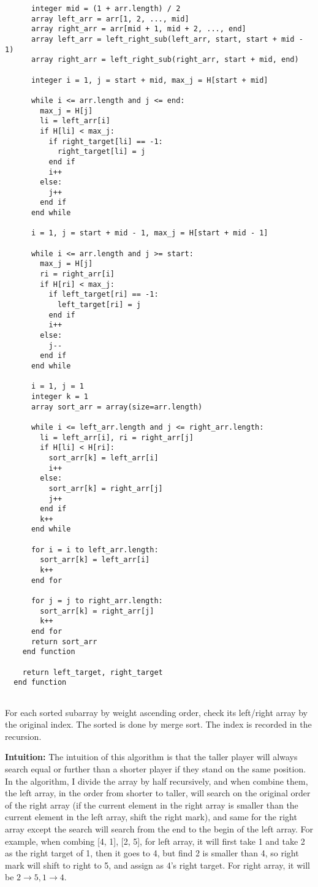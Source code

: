 \documentclass{article}
\begin{document}
\begin{enumerate}[topsep=0pt]
\begin{verbatim}
      integer mid = (1 + arr.length) / 2
      array left_arr = arr[1, 2, ..., mid]
      array right_arr = arr[mid + 1, mid + 2, ..., end]
      array left_arr = left_right_sub(left_arr, start, start + mid - 1)
      array right_arr = left_right_sub(right_arr, start + mid, end)

      integer i = 1, j = start + mid, max_j = H[start + mid]

      while i <= arr.length and j <= end:
        max_j = H[j]
        li = left_arr[i]
        if H[li] < max_j:
          if right_target[li] == -1:
            right_target[li] = j
          end if
          i++
        else:
          j++
        end if
      end while

      i = 1, j = start + mid - 1, max_j = H[start + mid - 1]
      
      while i <= arr.length and j >= start:
        max_j = H[j]
        ri = right_arr[i]
        if H[ri] < max_j:
          if left_target[ri] == -1:
            left_target[ri] = j
          end if
          i++
        else:
          j--
        end if
      end while

      i = 1, j = 1
      integer k = 1
      array sort_arr = array(size=arr.length)

      while i <= left_arr.length and j <= right_arr.length:
        li = left_arr[i], ri = right_arr[j]
        if H[li] < H[ri]:
          sort_arr[k] = left_arr[i]
          i++
        else:
          sort_arr[k] = right_arr[j]
          j++
        end if
        k++
      end while
      
      for i = i to left_arr.length:
        sort_arr[k] = left_arr[i]
        k++
      end for
      
      for j = j to right_arr.length:
        sort_arr[k] = right_arr[j]
        k++
      end for
      return sort_arr
    end function
    
    return left_target, right_target
  end function


\end{verbatim}

For each sorted subarray by weight ascending order, check its left/right array by the original index.
The sorted is done by merge sort. The index is recorded in the recursion.

\textbf{Intuition:}
The intuition of this algorithm is that the taller player will always search equal or further than a shorter player if they stand on the same position.
In the algorithm, I divide the array by half recursively, and when combine them, the left array, in the order from shorter to taller,
will search on the original order of the right array (if the current element in the right array is smaller than the current element in the left array, shift the right mark), 
and same for the right array except the search will search from the end to the begin of the left array.
For example, when combing [4, 1], [2, 5], for left array, it will first take 1 and take 2 as the right target of 1,
then it goes to 4, but find 2 is smaller than 4, so right mark will shift to right to 5, and assign as 4's right target.
For right array, it will be $2\rightarrow5, 1\rightarrow4$.


\end{enumerate}
\end{document}
